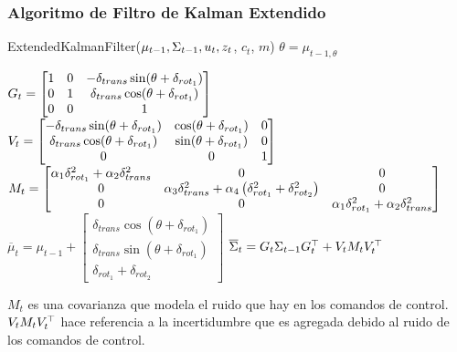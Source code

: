 \begin{frame}
    \frametitle{Algoritmo de Filtro de Kalman Extendido}
    \footnotesize
     \begin{algorithmic}[1]
        \State ExtendedKalmanFilter({$\mu_{t-1}, \Sigma_{t-1}, u_{t}, z_{t}$, $c_{t}$, $m$})
        \State $\theta = \mu_{t-1,\theta}$
        
        \State $
            G_{t} = 
            \begin{bmatrix}
                1 & 0 & -\delta_{trans} \sin(\theta + \delta_{rot_{1}})\\
                0 & 1 & \delta_{trans} \cos(\theta + \delta_{rot_{1}})\\
                0 & 0 & 1\\
            \end{bmatrix}
               $
        \State $
            V_{t} = 
            \begin{bmatrix}
                -\delta_{trans} \sin(\theta + \delta_{rot_{1}}) & \cos(\theta + \delta_{rot_{1}}) & 0\\
                \delta_{trans} \cos(\theta + \delta_{rot_{1}}) & \sin(\theta + \delta_{rot_{1}}) & 0\\
                0 & 0 & 1\\
            \end{bmatrix}
                $
        \State $
            M_{t} = 
            \begin{bmatrix}
                \alpha_{1}\delta^{2}_{rot_{1}} + \alpha_{2}\delta^{2}_{trans} & 0 & 0\\
                0 & \alpha_{3} \delta^{2}_{trans} + \alpha_{4} \left( \delta^{2}_{rot_{1}} + \delta^{2}_{rot_{2}} \right) & 0\\
                0 & 0 & \alpha_{1}\delta^{2}_{rot_{1}} + \alpha_{2}\delta^{2}_{trans}\\
            \end{bmatrix}
              $
        \State $\overline{\mu}_{t} = \mu_{t-1} + 
            \begin{bmatrix}
            \delta_{trans}\cos(\theta+\delta_{rot_{1}}) \\
            \delta_{trans}\sin(\theta+\delta_{rot_{1}}) \\
            \delta_{rot_{1}} + \delta_{rot_{2}}
        \end{bmatrix}$
        \State $\overline{\Sigma}_{t} = G_{t} \Sigma_{t-1} G_{t}^{\top}+V_{t} M_{t} V_{t}^{\top}$ 
    \end{algorithmic}
    \vspace{1em}
    $M_{t}$ es una covarianza que modela el ruido que hay en los comandos de control.
    $V_{t} M_{t} V_{t}^{\top}$ hace referencia a la incertidumbre que es agregada debido al ruido de los comandos de control.
    
\end{frame}

